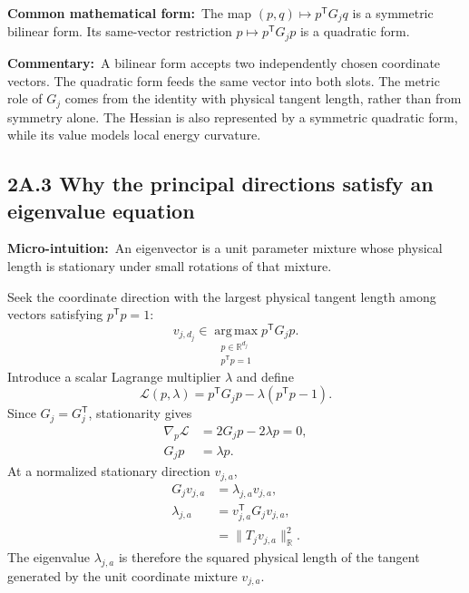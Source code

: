 \documentclass[10pt,twocolumn]{article}
\newcommand{\micro}[1]{\par\noindent\textbf{Micro-intuition:}\ #1\par}
\newcommand{\form}[1]{\par\noindent\textbf{Common mathematical form:}\ #1\par}
\newcommand{\commentary}[1]{\par\noindent\textbf{Commentary:}\ #1\par}
\newcommand{\conceptbreak}{\par\medskip\noindent{\color{black!30}\rule{\columnwidth}{0.35pt}}\par\medskip}
\begin{document}
\form{The map \((p,q)\mapsto p^{\mathsf T}G_jq\) is a symmetric bilinear
form. Its same-vector restriction \(p\mapsto p^{\mathsf T}G_jp\) is a
quadratic form.}

\commentary{A bilinear form accepts two independently chosen coordinate
vectors. The quadratic form feeds the same vector into both slots. The metric
role of \(G_j\) comes from the identity with physical tangent length, rather
than from symmetry alone. The Hessian is also represented by a symmetric
quadratic form, while its value models local energy curvature.}

\conceptbreak

\subsection*{2A.3 Why the principal directions satisfy an eigenvalue equation}

\micro{An eigenvector is a unit parameter mixture whose physical length is
stationary under small rotations of that mixture.}

Seek the coordinate direction with the largest physical tangent length among
vectors satisfying \(p^{\mathsf T}p=1\):
\begin{equation}
v_{j,d_j}\in
\operatorname*{arg\,max}_{\substack{p\in\mathbb R^{d_j}\\p^{\mathsf T}p=1}}
p^{\mathsf T}G_jp.
\label{eq:bridge-rayleigh-optimization}
\end{equation}
Introduce a scalar Lagrange multiplier \(\lambda\) and define
\begin{equation}
\mathcal L(p,\lambda)
=p^{\mathsf T}G_jp
-\lambda(p^{\mathsf T}p-1).
\label{eq:bridge-rayleigh-lagrangian}
\end{equation}
Since \(G_j=G_j^{\mathsf T}\), stationarity gives
\begin{align}
\nabla_p\mathcal L
&=2G_jp-2\lambda p=0,
\label{eq:bridge-rayleigh-gradient}\\
G_jp&=\lambda p.
\label{eq:bridge-rayleigh-eigenproblem}
\end{align}
At a normalized stationary direction \(v_{j,a}\),
\begin{align}
G_jv_{j,a}&=\lambda_{j,a}v_{j,a},
\label{eq:bridge-full-eigenpair}\\
\lambda_{j,a}
&=v_{j,a}^{\mathsf T}G_jv_{j,a},
\label{eq:bridge-eigenvalue-rayleigh}\\
&=\|T_jv_{j,a}\|_{\mathbb R}^2.
\label{eq:bridge-eigenvalue-physical-length}
\end{align}
The eigenvalue \(\lambda_{j,a}\) is therefore the squared physical length of
the tangent generated by the unit coordinate mixture \(v_{j,a}\).
\end{document}
